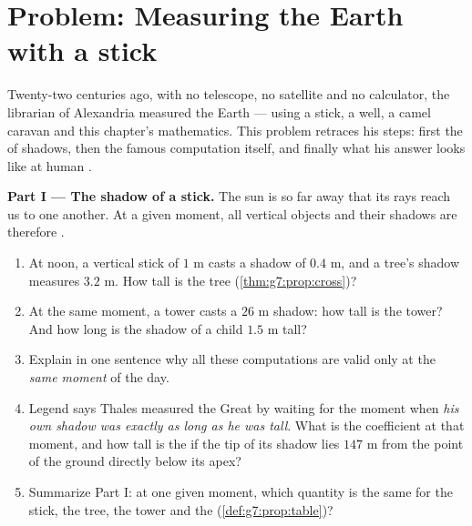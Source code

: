 \section{Problem: Measuring the Earth with a stick}

\begin{problem}
\label{pb:g7:prop:1}
Twenty-two centuries ago, with no telescope, no satellite and no
calculator, the librarian of Alexandria measured the Earth ---
using a stick, a well, a camel caravan and this chapter's
mathematics. This problem retraces his steps: first the
 of shadows, then the famous computation itself,
and finally what his answer looks like at human .

\medskip
\noindent\textbf{Part I --- The shadow of a stick.}
The sun is so far away that its rays reach us  to one
another. At a given moment, all vertical objects and their
shadows are therefore .
\begin{enumerate}
  \item At noon, a vertical stick of $1$ m casts a shadow of
        $0.4$ m, and a tree's shadow measures $3.2$ m. How tall
        is the tree (\cref{thm:g7:prop:cross})?
  \item At the same moment, a tower casts a $26$ m shadow: how
        tall is the tower? And how long is the shadow of a child
        $1.5$ m tall?
  \item Explain in one sentence why all these computations are
        valid only at the \emph{same moment} of the day.
  \item Legend says Thales measured the Great  by waiting
        for the moment when \emph{his own shadow was exactly as
        long as he was tall}. What is the 
        coefficient at that moment, and how tall is the 
        if the tip of its shadow lies $147$ m from the point of
        the ground directly below its apex?
  \item Summarize Part I: at one given moment, which quantity is
        the same for the stick, the tree, the tower and the
         (\cref{def:g7:prop:table})?
\end{enumerate}


\end{problem}
